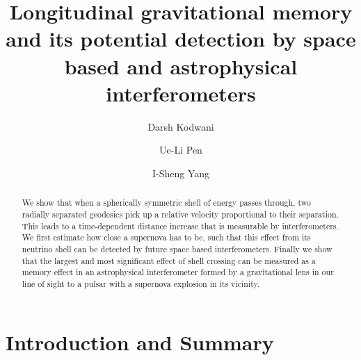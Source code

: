 \documentclass[aps,showpacs,twocolumn,floats,prd,superscriptaddress,nofootinbib]{revtex4-1}
\begin{document}
\title{Longitudinal gravitational memory and its potential detection by space based and astrophysical interferometers}

\author{Darsh Kodwani}

\author{Ue-Li Pen}

\author{I-Sheng Yang}

\begin{abstract}
We show that when a spherically symmetric shell of energy passes through, two radially separated geodesics pick up a relative velocity proportional to their separation. This leads to a time-dependent distance increase that is measurable by interferometers. We first estimate how close a supernova has to be, such that this effect from its neutrino shell can be detected by future space based interferometers. Finally we show that the largest and most significant effect of shell crossing can be measured as a memory effect in an astrophysical interferometer formed by a gravitational lens in our line of sight to a pulsar with a supernova explosion in its vicinity.
\end{abstract}

\maketitle

\section{Introduction and Summary}
\end{document}
